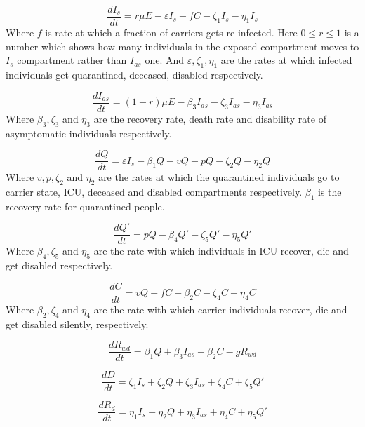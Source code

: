 \documentclass[12pt, a4paper]{article}
\begin{document}
	\begin{equation}
		\frac{d I_s}{dt} = r \mu E - \varepsilon I_s + fC - \zeta_1 I_s - \eta_1 I_s
	\end{equation}
	Where $f$ is rate at which a fraction of carriers gets re-infected. Here $0 \le r \le 1$ is a number which shows how many individuals in the exposed compartment moves to $I_s$ compartment rather than $I_{as}$ one. And $\varepsilon, \zeta_1, \eta_1$ are the rates at which infected individuals get quarantined, deceased, disabled respectively.

	\begin{equation}
		\frac{d I_{as}}{dt} = (1 - r)\mu E - \beta_3 I_{as} - \zeta_3 I_{as} - \eta_3 I_{as}
	\end{equation}
	Where $\beta_3, \zeta_3$ and $\eta_3$ are the recovery rate, death rate and disability rate of asymptomatic individuals respectively.

	\begin{equation}
		\frac{dQ}{dt} = \varepsilon I_s - \beta_1 Q - vQ - pQ - \zeta_2 Q - \eta_2 Q
	\end{equation}
	Where $v, p, \zeta_2$ and $\eta_2$ are the rates at which the quarantined individuals go to carrier state, ICU, deceased and disabled compartments respectively. $\beta_1$ is the recovery rate for quarantined people.
	
	\begin{equation}
		\frac{d Q'}{dt} = pQ - \beta_4 Q' - \zeta_5 Q' - \eta_5 Q'
	\end{equation}
	Where $\beta_4, \zeta_5$ and $\eta_5$ are the rate with which individuals in ICU recover, die and get disabled respectively.

	\begin{equation}
		\frac{dC}{dt} = vQ - fC - \beta_2 C - \zeta_4 C - \eta_4 C
	\end{equation}
	Where $\beta_2, \zeta_4$ and $\eta_4$ are the rate with which carrier individuals recover, die and get disabled silently, respectively.

	\begin{equation}
		\frac{dR_{wd}}{dt} = \beta_1 Q + \beta_3 I_{as} + \beta_2 C - gR_{wd}
	\end{equation}

	\begin{equation}
		\frac{dD}{dt} = \zeta_1 I_s + \zeta_2 Q + \zeta_3 I_{as} + \zeta_4 C + \zeta_5 Q'
	\end{equation}

	\begin{equation}
		\frac{dR_d}{dt} = \eta_1 I_s + \eta_2 Q + \eta_3 I_{as} + \eta_4 C + \eta_5 Q'
	\end{equation}
\end{document}
